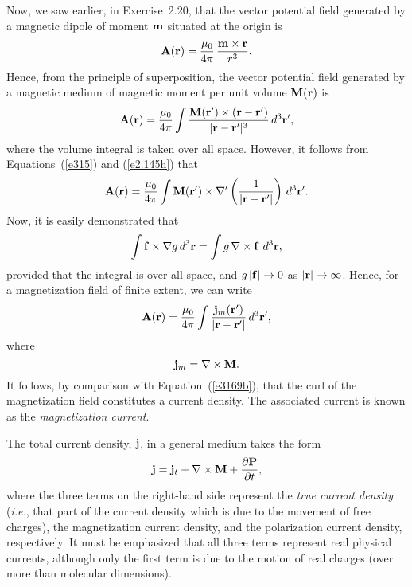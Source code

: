 Now, we saw earlier, in Exercise~2.20, that the vector potential field generated by a
magnetic dipole of moment ${\bf m}$ situated at the origin is
\begin{equation}
{\bf A}({\bf r}) = \frac{\mu_0}{4\pi}\,\frac{{\bf m}\times {\bf r}}{r^3}.
\end{equation}
Hence, from the principle of superposition, the vector potential field
generated by a magnetic medium of magnetic moment per unit volume
${\bf M}({\bf r})$ is
\begin{equation}
{\bf A}({\bf r}) = \frac{\mu_0}{4\pi}\int \frac{{\bf M}({\bf r}')\times ({\bf r}-{\bf r}')}{|{\bf r}-{\bf r}'|^3}\,d^3{\bf r}',
\end{equation}
where the volume integral is taken over all space.
 However, it follows from Equations~(\ref{e315}) and (\ref{e2.145h}) that
\begin{equation}
{\bf A}({\bf r}) = \frac{\mu_0}{4\pi}\int {\bf M}({\bf r}')\times \nabla'\left(\frac{1}{|{\bf r}-{\bf r}'|}\right)\,d^3{\bf r}'.
\end{equation}
Now, it is easily demonstrated that
\begin{equation}
\int {\bf f}\times \nabla g\,d^3{\bf r}= \int g\,\nabla\times {\bf f}\,\,d^3{\bf r},
\end{equation}
provided that the integral is over all space, and $g\,|{\bf f}|\rightarrow 0$ as
$|{\bf r}|\rightarrow\infty$. Hence, for a magnetization field of
finite extent, we can write
\begin{equation}
{\bf A}({\bf r}) = \frac{\mu_0}{4\pi}\int \frac{{\bf j}_m({\bf r}')}{|{\bf r}-{\bf r}'|}\,d^3{\bf r}',
\end{equation}
where
\begin{equation}
{\bf j}_m = \nabla\times {\bf M}.
\end{equation}
It follows, by comparison with Equation~(\ref{e3169b}), that the curl
of the magnetization field constitutes a current density. The associated
current is known as the {\em magnetization current}.

The total current density, ${\bf j}$, in a general medium takes the form
\begin{equation}\label{ejmag}
{\bf j} = {\bf j}_t + \nabla\times{\bf M} + \frac{\partial{\bf P}}{\partial t},
\end{equation}
where the three terms on the right-hand side represent the {\em true current density}\/
({\em i.e.}, that part of the current density which is due to the movement of free charges), the magnetization current density, and the polarization current density,
respectively.
It must be emphasized that all three terms represent
real physical currents, although only the first term is due to the motion
of real charges (over more than molecular dimensions). 

